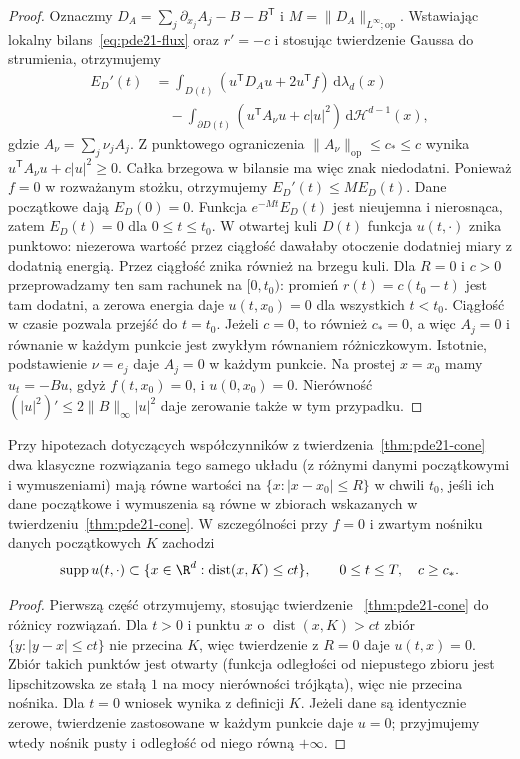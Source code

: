 \begin{proof}
Oznaczmy $D_A=\sum_j\partial_{x_j}A_j-B-B^\mathsf T$
i $M=\|D_A\|_{L^\infty;\mathrm{op}}$.
Wstawiając lokalny bilans~\eqref{eq:pde21-flux}
oraz $r'=-c$ i stosując twierdzenie Gaussa do strumienia,
otrzymujemy
\[
 \begin{split}
 E_D'(t)
 &=\int_{D(t)}(u^\mathsf TD_Au+2u^\mathsf Tf)
       \,\mathrm d\lambda_d(x)\\
 &\quad-\int_{\partial D(t)}
       (u^\mathsf TA_\nu u+c|u|^2)\,\mathrm d\mathcal H^{d-1}(x),
 \end{split}
\]
gdzie $A_\nu=\sum_j\nu_jA_j$. Z punktowego ograniczenia
$\|A_\nu\|_{\mathrm{op}}\le c_*\le c$ wynika
$u^\mathsf TA_\nu u+c|u|^2\ge0$. Całka brzegowa
w bilansie ma więc znak niedodatni. Ponieważ
$f=0$ w rozważanym stożku, otrzymujemy
$E_D'(t)\le M E_D(t)$. Dane początkowe dają $E_D(0)=0$.
Funkcja $e^{-Mt}E_D(t)$ jest nieujemna i nierosnąca,
zatem $E_D(t)=0$ dla $0\le t\le t_0$.
W otwartej kuli $D(t)$ funkcja $u(t,\cdot)$ znika
punktowo: niezerowa wartość przez ciągłość dawałaby
otoczenie dodatniej miary z dodatnią energią.
Przez ciągłość znika również na brzegu kuli. Dla $R=0$ i $c>0$ przeprowadzamy ten sam rachunek na $[0,t_0)$:
promień $r(t)=c(t_0-t)$ jest tam dodatni, a zerowa energia daje
$u(t,x_0)=0$ dla wszystkich $t<t_0$. Ciągłość w czasie pozwala
przejść do $t=t_0$. Jeżeli $c=0$, to również $c_*=0$, a więc
$A_j=0$ i równanie w każdym punkcie jest zwykłym równaniem
różniczkowym. Istotnie, podstawienie $\nu=e_j$
daje $A_j=0$ w każdym punkcie. Na prostej $x=x_0$
mamy $u_t=-Bu$, gdyż $f(t,x_0)=0$, i $u(0,x_0)=0$.
Nierówność $(|u|^2)'\le2\|B\|_\infty |u|^2$
daje zerowanie także w tym przypadku.
\end{proof}

\begin{wniosek}
Przy hipotezach dotyczących współczynników
z twierdzenia~\ref{thm:pde21-cone}
dwa klasyczne rozwiązania tego samego układu
(z różnymi danymi początkowymi i wymuszeniami)
mają równe wartości na $\{x:|x-x_0|\le R\}$ w chwili
$t_0$, jeśli ich dane początkowe i wymuszenia są równe
w zbiorach wskazanych w twierdzeniu~\ref{thm:pde21-cone}.
W szczególności przy $f=0$ i zwartym nośniku danych
początkowych $K$ zachodzi
\[
 \operatorname{supp}u(t,\cdot)
 \subset \{x\in\R^d:\operatorname{dist}(x,K)\le ct\},
 \qquad 0\le t\le T,\quad c\ge c_*.
\]
\end{wniosek}
\begin{proof}
Pierwszą część otrzymujemy, stosując twierdzenie
~\ref{thm:pde21-cone} do różnicy rozwiązań.
Dla $t>0$ i punktu $x$ o $\operatorname{dist}(x,K)>ct$
zbiór $\{y:|y-x|\le ct\}$ nie przecina $K$,
więc twierdzenie z $R=0$ daje $u(t,x)=0$.
Zbiór takich punktów jest otwarty (funkcja odległości
od niepustego zbioru jest lipschitzowska ze stałą $1$
na mocy nierówności trójkąta), więc nie przecina nośnika.
Dla $t=0$ wniosek wynika z definicji $K$.
Jeżeli dane są identycznie zerowe, twierdzenie zastosowane
w każdym punkcie daje $u=0$; przyjmujemy wtedy nośnik
pusty i odległość od niego równą $+\infty$.
\end{proof}



